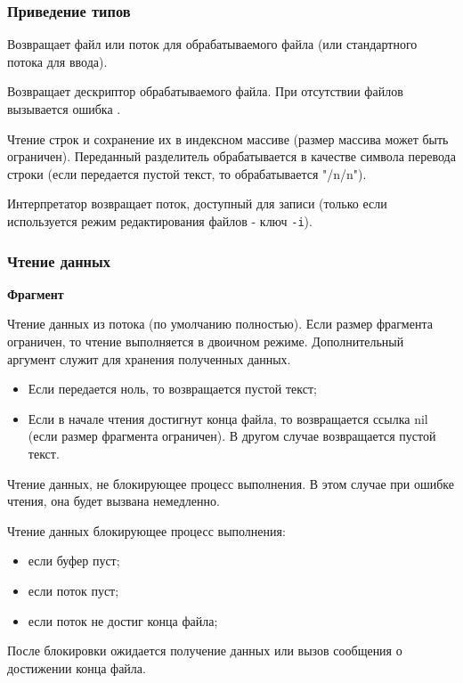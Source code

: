 \subsubsection{Приведение типов}

\begin{methodlist}
  Возвращает файл или поток для обрабатываемого файла (или стандартного потока для ввода).

  Возвращает дескриптор обрабатываемого файла. При отсутствии файлов вызывается ошибка .


  Чтение строк и сохранение их в индексном массиве (размер массива может быть ограничен). Переданный разделитель обрабатывается в качестве символа перевода строки (если передается пустой текст, то обрабатывается "/n/n").
 
  Интерпретатор возвращает поток, доступный для записи (только если используется режим редактирования файлов - ключ \verb!-i!).
\end{methodlist}

\subsubsection{Чтение данных}

{\bf Фрагмент}

\begin{methodlist}
  Чтение данных из потока (по умолчанию полностью). Если размер фрагмента ограничен, то чтение выполняется в двоичном режиме. Дополнительный аргумент служит для хранения полученных данных.
  \begin{itemize}
    \item Если передается ноль, то возвращается пустой текст;
    \item Если в начале чтения достигнут конца файла, то возвращается ссылка nil (если размер фрагмента ограничен). В другом случае возвращается пустой текст. 
  \end{itemize}

  Чтение данных, не блокирующее процесс выполнения. В этом случае при ошибке чтения, она будет вызвана немедленно.
 
  Чтение данных блокирующее процесс выполнения:
  \begin{itemize}
    \item если буфер пуст;
    \item если поток пуст;
    \item если поток не достиг конца файла;
  \end{itemize}
  
  После блокировки ожидается получение данных или вызов сообщения о достижении конца файла.
\end{methodlist}

